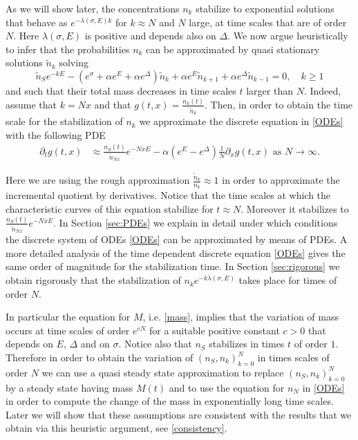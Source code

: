 \documentclass{article}
\numberwithin{equation}{section}
\theoremstyle{plain}
\begin{document}
As we will show later, the concentrations $n_k $ stabilize to exponential solutions that behave as $e^{- \lambda(\sigma, E) k } $ for $k \approx N $ and $N $ large, at time scales that are of order $N $. Here $\lambda(\sigma, E) $ is positive and depends also on $\Delta$. 
We now argue heuristically to infer that the probabilities $n_k$ can be approximated by quasi stationary solutions $\tilde{n}_k$ solving 
\[
\tilde{n}_S e^{- k E} - \left( e^{\sigma } + \alpha e^E + \alpha e^\Delta  \right)  \tilde{n}_k + \alpha e^E \tilde{n}_{k+1}  + \alpha e^{\Delta} \tilde{n}_{k-1} =0,  \quad k \geq 1 
\] and such that their total mass decreases in time scales $t $ larger than $N$. 
Indeed, assume that $k=Nx $ and that $g(t, x)=\frac{ n_{k }(t) }{\tilde{n}_k}$. Then, in order to obtain the time scale for the stabilization of $n_k $ we approximate the discrete equation in \eqref{ODEs} with the following PDE
\begin{align*}
\partial_t g(t, x)  & \approx\frac{n_{S}(t)}{\tilde{n}_{Nx}} e^{-NxE}  -  \alpha (e^E- e^\Delta) \frac{1}{N} \partial_x g(t,x)  \text{ as } N \to \infty.
\end{align*}

Here we are using the rough approximation $ \frac{\tilde{n}_{k} }{n_k } \approx 1 $ in order to approximate the incremental quotient by derivatives. Notice that the time scales at which the characteristic curves of this equation stabilize for $t \approx N $. Moreover it stabilizes to  $\frac{n_{S}(t)}{\tilde{n}_{Nx}} e^{-NxE} $. 
In Section \ref{sec:PDEs} we explain in detail under which conditions the discrete system of ODEs \eqref{ODEs} can be approximated by means of PDEs. 
A more detailed analysis of the time dependent discrete  equation \eqref{ODEs} gives the same order of magnitude for the stabilization time. In Section \ref{sec:rigorous} we obtain rigorously that the stabilization of  $n_k e^{ -k \lambda (\sigma, E) }$ takes place for times of order $N$.   



In particular the equation for $M$, i.e. \eqref{mass}, implies that the variation of mass occurs at time scales of order $e^{ c  N } $ for a suitable positive constant $c>0 $ that depends on $E$, $\Delta$ and on $\sigma $. Notice also that $n_S$ stabilizes in times $t$ of order $1$. Therefore in order to obtain the variation of $ (n_S, n_k)_{k=0}^N $ in times scales of order $N $ we can use a quasi steady state approximation to replace $(n_S, n_k )_{k=0}^N $ by a steady state having mass $M (t)$ and to use the equation for $n_N $ in \eqref{ODEs} in order to compute the change of the mass in exponentially long time scales.   
Later we will show that these assumptions are consistent with the results that we obtain via this heuristic argument, see \eqref{consistency}.
\end{document}
